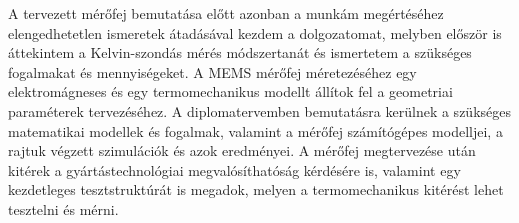 A tervezett mérőfej bemutatása előtt azonban a munkám megértéséhez elengedhetetlen ismeretek átadásával kezdem a dolgozatomat, melyben először is áttekintem a Kelvin-szondás mérés módszertanát és ismertetem a szükséges fogalmakat és mennyiségeket. A MEMS mérőfej méretezéséhez egy elektromágneses és egy termomechanikus modellt állítok fel a geometriai paraméterek tervezéséhez. A diplomatervemben bemutatásra kerülnek a szükséges matematikai modellek és fogalmak, valamint a mérőfej számítógépes modelljei, a rajtuk végzett szimulációk és azok eredményei. A mérőfej megtervezése után kitérek a gyártástechnológiai megvalósíthatóság kérdésére is, valamint egy kezdetleges tesztstruktúrát is megadok, melyen a termomechanikus kitérést lehet tesztelni és mérni.
